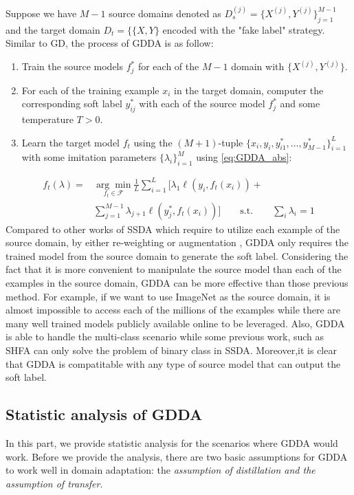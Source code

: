Suppose we have $M-1$ source domains denoted as $D_s^{(j)}=\{X^{(j)},Y^{(j)}\}_{j=1}^{M-1}$ and the target domain $D_t=\{\{X,Y\}$ encoded with the "fake label" strategy. Similar to GD, the process of GDDA is as follow:
\begin{enumerate}
    \item Train the source models $f^*_j$ for each of the $M-1$ domain with $\{X^{(j)},Y^{(j)}\}$.
    \item For each of the training example $x_i$ in the target domain, computer the corresponding soft label $y^*_{ij}$ with each of the source model $f^*_j$ and some temperature $T>0$.
    \item Learn the target model $f_t$ using the $(M+1)$-tuple $\{x_i,y_i,y^*_{i1},\dots,y^*_{M-1}\}_{i=1}^L$ with some imitation parameters $\{\lambda_i\}^M_{i=1}$ using \eqref{eq:GDDA_abs}:
\end{enumerate} 
\begin{equation}\label{eq:GDDA_abs}
\begin{aligned}
f_t(\lambda)=&\underset{f_t \in \mathcal{F}}{\arg \min}\frac{1}{L}\sum_{i=1}^{L}[\lambda_1\ell\left(y_i,f_t(x_i)\right)+\\&\sum_{j=1}^{M-1}\lambda_{j+1}\ell\left(y^*_j,f_t(x_i)\right)]\qquad
 \text{s.t.} \qquad \sum_i\lambda_i=1
\end{aligned}
\end{equation}
Compared to other works of SSDA which require to utilize each example of the source domain, by either re-weighting \cite{Donahue_2013_CVPR,duan2012visual} or augmentation \cite{daume2010frustratingly}, GDDA only requires the trained model from the source domain to generate the soft label. Considering the fact that it is more convenient to manipulate the source model than each of the examples in the source domain, GDDA can be more effective than those previous method. For example, if we want to use ImageNet \cite{imagenet_cvpr09} as the source domain, it is almost impossible to access each of the millions of the examples while there are many well trained models publicly available online to be leveraged. Also, GDDA is able to handle the multi-class scenario while some previous work, such as SHFA\cite{duan2012learning} can only solve the problem of binary class in SSDA. Moreover,it is clear that GDDA is compatitable with any type of source model that can output the soft label.

\subsection{Statistic analysis of GDDA}
In this part, we provide statistic analysis for the scenarios where GDDA would work. Before we provide the analysis, there are two basic assumptions for GDDA to work well in domain adaptation: the \textit{assumption of distillation and  the assumption of  transfer}.

